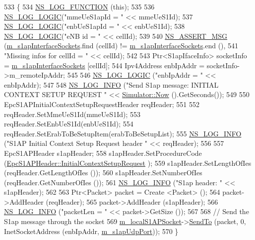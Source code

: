 \begin{DoxyCode}
533 \{
534   \hyperlink{log-macros-disabled_8h_a90b90d5bad1f39cb1b64923ea94c0761}{NS\_LOG\_FUNCTION} (\textcolor{keyword}{this});
535 
536   \hyperlink{group__logging_ga88acd260151caf2db9c0fc84997f45ce}{NS\_LOG\_LOGIC}(\textcolor{stringliteral}{"mmeUeS1apId = "} << mmeUeS1Id);
537   \hyperlink{group__logging_ga88acd260151caf2db9c0fc84997f45ce}{NS\_LOG\_LOGIC}(\textcolor{stringliteral}{"enbUeS1apId = "} << enbUeS1Id);
538   \hyperlink{group__logging_ga88acd260151caf2db9c0fc84997f45ce}{NS\_LOG\_LOGIC}(\textcolor{stringliteral}{"eNB id = "} << cellId);
539 
540   \hyperlink{assert_8h_aff5ece9066c74e681e74999856f08539}{NS\_ASSERT\_MSG} (\hyperlink{classns3_1_1EpcS1apMme_a415a57f1b3b88750ecf99e6bf3187476}{m\_s1apInterfaceSockets}.find (cellId) != 
      \hyperlink{classns3_1_1EpcS1apMme_a415a57f1b3b88750ecf99e6bf3187476}{m\_s1apInterfaceSockets}.end (),
541                \textcolor{stringliteral}{"Missing infos for cellId = "} << cellId);
542 
543   Ptr<S1apIfaceInfo> socketInfo = \hyperlink{classns3_1_1EpcS1apMme_a415a57f1b3b88750ecf99e6bf3187476}{m\_s1apInterfaceSockets} [cellId];
544   Ipv4Address enbIpAddr = socketInfo->m\_remoteIpAddr;
545 
546   \hyperlink{group__logging_ga88acd260151caf2db9c0fc84997f45ce}{NS\_LOG\_LOGIC} (\textcolor{stringliteral}{"enbIpAddr = "} << enbIpAddr);
547 
548   \hyperlink{group__logging_gafbd73ee2cf9f26b319f49086d8e860fb}{NS\_LOG\_INFO} (\textcolor{stringliteral}{"Send S1ap message: INITIAL CONTEXT SETUP REQUEST "} << 
      \hyperlink{classns3_1_1Simulator_ac3178fa975b419f7875e7105be122800}{Simulator::Now} ().GetSeconds());
549 
550   EpcS1APInitialContextSetupRequestHeader reqHeader;
551   
552   reqHeader.SetMmeUeS1Id(mmeUeS1Id);
553   reqHeader.SetEnbUeS1Id(enbUeS1Id);
554   reqHeader.SetErabToBeSetupItem(erabToBeSetupList);
555   \hyperlink{group__logging_gafbd73ee2cf9f26b319f49086d8e860fb}{NS\_LOG\_INFO} (\textcolor{stringliteral}{"S1AP Initial Context Setup Request header "} << reqHeader);
556 
557   EpcS1APHeader s1apHeader;
558   s1apHeader.SetProcedureCode (\hyperlink{classns3_1_1EpcS1APHeader_aedd7ba8568bf04ce8960bd840712a63eaee7f11dc02c8f9c13cc21727512cb72f}{EpcS1APHeader::InitialContextSetupRequest}
      );
559   s1apHeader.SetLengthOfIes (reqHeader.GetLengthOfIes ());
560   s1apHeader.SetNumberOfIes (reqHeader.GetNumberOfIes ());
561   \hyperlink{group__logging_gafbd73ee2cf9f26b319f49086d8e860fb}{NS\_LOG\_INFO} (\textcolor{stringliteral}{"S1ap header: "} << s1apHeader);
562 
563   Ptr<Packet> packet = Create <Packet> ();
564   packet->AddHeader (reqHeader);
565   packet->AddHeader (s1apHeader);
566   \hyperlink{group__logging_gafbd73ee2cf9f26b319f49086d8e860fb}{NS\_LOG\_INFO} (\textcolor{stringliteral}{"packetLen = "} << packet->GetSize ());
567 
568   \textcolor{comment}{// Send the S1ap message through the socket}
569   \hyperlink{classns3_1_1EpcS1apMme_ac6fd7b6db143acc64d001a9fec7b0f3f}{m\_localS1APSocket}->\hyperlink{classns3_1_1Socket_af898fce6a58e0dbba23c1c6de1d4220e}{SendTo} (packet, 0, InetSocketAddress (enbIpAddr, 
      \hyperlink{classns3_1_1EpcS1apMme_a5e2c2bf88a5bab4629e9b38ccdf48e53}{m\_s1apUdpPort}));
570 \}
\end{DoxyCode}


